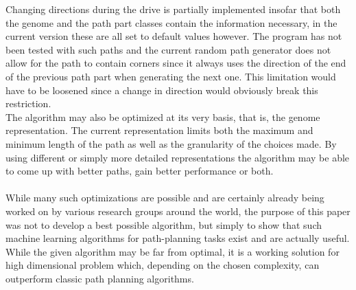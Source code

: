 Changing directions during the drive is partially implemented insofar that both the genome and the path part classes contain the information necessary, in the current version these are all set to default values however. The program has not been tested with such paths and the current random path generator does not allow for the path to contain corners since it always uses the direction of the end of the previous path part when generating the next one. This limitation would have to be loosened since a change in direction would obviously break this restriction.\\
The algorithm may also be optimized at its very basis, that is, the genome representation. The current representation limits both the maximum and minimum length of the path as well as the granularity of the choices made. By using different or simply more detailed representations the algorithm may be able to come up with better paths, gain better performance or both.\\
\\
While many such optimizations are possible and are certainly already being worked on by various research groups around the world, the purpose of this paper was not to develop a best possible algorithm, but simply to show that such machine learning algorithms for path-planning tasks exist and are actually useful. While the given algorithm may be far from optimal, it is a working solution for high dimensional problem which, depending on the chosen complexity, can outperform classic path planning algorithms.